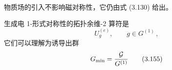 物质场的引入不影响磁对称性，它仍由式 (3.130) 给出。

生成电 1-形式对称性的拓扑余维-2 算符是
\begin{equation}
    U_g^{(e)} ,\qquad g \in G^{(1)} \,,
    \tag{3.154}
\end{equation}
它们可以理解为诱导出群
\begin{equation}
    G_{\min} = \frac{\mathcal{G}}{G^{(1)}}
    \tag{3.155}
\end{equation}

